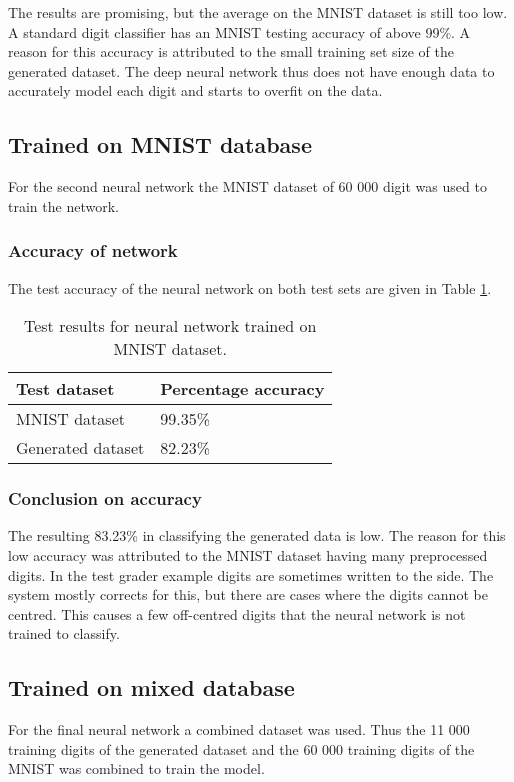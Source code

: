 The results are promising, but the average on the MNIST dataset is still too low. A standard digit classifier has an MNIST testing accuracy of above 99\%. A reason for this accuracy is attributed to the small training set size of the generated dataset. The deep neural network thus does not have enough data to accurately model each digit and starts to overfit on the data.

\subsection{Trained on MNIST database}
For the second neural network the MNIST dataset of 60 000 digit was used to train the network.

\subsubsection{Accuracy of network}
The test accuracy of the neural network on both test sets are given in Table \ref{tbl:nnResult2}.

\begin{table}
\caption{Test results for neural network trained on MNIST dataset.} \label{tbl:nnResult2}
  \centering
\begin{tabular}{|p{4cm}|p{5cm}|}
\hline
\textbf{Test dataset}&\textbf{Percentage accuracy}\\
\hline
MNIST dataset&99.35\%\\
\hline
Generated dataset&82.23\%\\
\hline
\end{tabular}
\end{table}

\subsubsection{Conclusion on accuracy}

The resulting 83.23\% in classifying the generated data is low. The reason for this low accuracy was attributed to the MNIST dataset having many preprocessed digits. In the test grader example digits are sometimes written to the side. The system mostly corrects for this, but there are cases where the digits cannot be centred. This causes a few off-centred digits that the neural network is not trained to classify.

\subsection{Trained on mixed database}
For the final neural network a combined dataset was used. Thus the 11 000 training digits of the generated dataset and the 60 000 training digits of the MNIST was combined to train the model.

